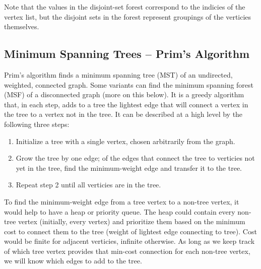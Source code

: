 \documentclass[12pt, titlepage]{article}
\begin{document}
Note that the values in the disjoint-set forest correspond to the indicies of the vertex list, but the disjoint sets in the forest represent groupings of the verticies themselves.

\subsection{Minimum Spanning Trees -- Prim's Algorithm} \label{prim}

Prim's algorithm finds a minimum spanning tree (MST) of an undirected, weighted, connected graph. Some variants can find the minimum spanning forest (MSF) of a disconnected graph (more on this below). It is a greedy algorithm that, in each step, adds to a tree the lightest edge that will connect a vertex in the tree to a vertex not in the tree. It can be described at a high level by the following three steps:

\begin{enumerate}
  \item Initialize a tree with a single vertex, chosen arbitrarily from the graph.
  \item Grow the tree by one edge; of the edges that connect the tree to verticies not yet in the tree, find the minimum-weight edge and transfer it to the tree.
  \item Repeat step 2 until all verticies are in the tree.
\end{enumerate}

To find the minimum-weight edge from a tree vertex to a non-tree vertex, it would help to have a heap or priority queue. The heap could contain every non-tree vertex (initially, every vertex) and prioritize them based on the minimum cost to connect them to the tree (weight of lightest edge connecting to tree). Cost would be finite for adjacent verticies, infinite otherwise. As long as we keep track of which tree vertex provides that min-cost connection for each non-tree vertex, we will know which edges to add to the tree. \\
\end{document}
